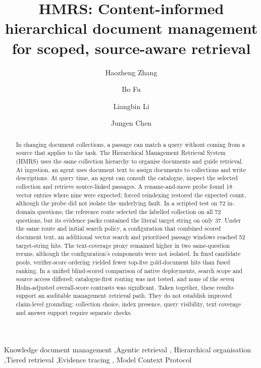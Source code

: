 \documentclass[review,12pt]{elsarticle}
\begin{document}
\begin{frontmatter}

\title{HMRS: Content-informed hierarchical document management for scoped, source-aware retrieval}

\author[inst1]{Haozheng Zhang}
\author[inst2]{Bo Fu}
\author[inst2]{Liangbin Li}
\author[inst1]{Jungen Chen}

\begin{abstract}
In changing document collections, a passage can match a query without
coming from a source that applies to the task. The Hierarchical Management
Retrieval System (HMRS) uses the same collection hierarchy to organise
documents and guide retrieval. At ingestion, an agent uses document text
to assign documents to collections and write descriptions. At query time,
an agent can consult the catalogue, inspect the selected collection and
retrieve source-linked passages. A rename-and-move probe found 18
vector entries where nine were expected; forced reindexing restored the
expected count, although the probe did not isolate the underlying fault. In
a scripted test on 72 in-domain questions, the reference route selected the
labelled collection on all 72 questions, but its evidence packs contained the
literal target string on only 37. Under the same route and initial search
policy, a configuration that combined scored document text, an additional
vector search and prioritised passage windows reached 52 target-string hits.
The text-coverage proxy remained higher in two same-question reruns,
although the configuration's components were not isolated. In fixed candidate pools,
verifier-score ordering yielded fewer top-five gold-document hits than fused
ranking. In a unified blind-scored comparison of native deployments, search scope and
source access differed; catalogue-first routing was not tested, and none of
the seven Holm-adjusted overall-score contrasts was significant. Taken together, these
results support an auditable management--retrieval path. They do not establish
improved claim-level grounding: collection choice, index presence, query
visibility, text coverage and answer support require separate checks.
\end{abstract}

\begin{keyword}
Knowledge document management \sep Agentic retrieval \sep
Hierarchical organisation \sep Tiered retrieval \sep Evidence tracing \sep
Model Context Protocol
\end{keyword}

\end{frontmatter}
\end{document}
